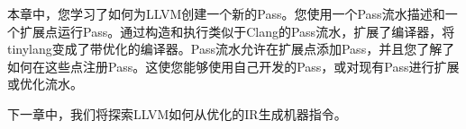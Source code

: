 本章中，您学习了如何为LLVM创建一个新的Pass。您使用一个Pass流水描述和一个扩展点运行Pass。通过构造和执行类似于Clang的Pass流水，扩展了编译器，将tinylang变成了带优化的编译器。Pass流水允许在扩展点添加Pass，并且您了解了如何在这些点注册Pass。这使您能够使用自己开发的Pass，或对现有Pass进行扩展或优化流水。\par

下一章中，我们将探索LLVM如何从优化的IR生成机器指令。\par

\newpage